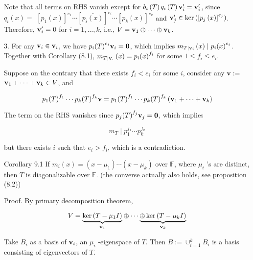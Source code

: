 \documentclass[11pt]{article}
\begin{document}
Note that all terms on RHS vanish except for \({b}_{i}\left( T\right) {q}_{i}\left( T\right) {\bf v}_{i}^{\prime } = {\bf v}_{i}^{\prime }\), since \({q}_{i}\left( x\right)  =\)  \({\left\lbrack  {p}_1\left( x\right) \right\rbrack  }^{{e}_1}\cdots {\left\lbrack  \overline{{p}_{i}\left( x\right) }\right\rbrack  }^{{e}_{i}}\cdots {\left\lbrack  {p}_{k}\left( x\right) \right\rbrack  }^{{e}_{k}}\) and \({\bf v}_{j}^{\prime } \in  \ker \left( {\left\lbrack  {p}_{j}\left( x\right) \right\rbrack  }^{{e}_{j}}\right)\). Therefore, \({\bf v}_{i}^{\prime } = 0\) for \(i = 1,\ldots ,k\), i.e., \(V = {\bf v}_1 \oplus  \cdots  \oplus  {\bf v}_{k}\).

3. For any \({\bf v}_{i} \in  {\bf v}_{i}\), we have \({p}_{i}{\left( T\right) }^{{e}_{i}}{\bf v}_{i} = \mathbf{0}\), which implies \({m}_{T \mid  {\bf v}_{i}}\left( x\right)  \mid  {p}_{i}{\left( x\right) }^{{e}_{i}}\). Together with Corollary (8.1), \({m}_{T \mid  {\bf v}_{i}}\left( x\right)  = {p}_{i}{\left( x\right) }^{{f}_{i}}\) for some \(1 \leq  {f}_{i} \leq  {e}_{i}\).

Suppose on the contrary that there exists \({f}_{i} < {e}_{i}\) for some \(i\), consider any \(\mathbf{v} \mathrel{\text{ := }}\)  \({\bf v}_1 + \cdots  + {\bf v}_{k} \in  V\), and

\[
{p}_1{\left( T\right) }^{{f}_1}\cdots {p}_{k}{\left( T\right) }^{{f}_{k}}\mathbf{v} = {p}_1{\left( T\right) }^{{f}_1}\cdots {p}_{k}{\left( T\right) }^{{f}_{k}}\left( {{\bf v}_1 + \cdots  + {\bf v}_{k}}\right)
\]

The term on the RHS vanishes since \({p}_{j}{\left( T\right) }^{{f}_{j}}{\bf v}_{j} = \mathbf{0}\), which implies

\[
{m}_{T} \mid  {p}_1^{{f}_1}\cdots {p}_{k}^{{f}_{k}}
\]

but there exists \(i\) such that \({e}_{i} > {f}_{i}\), which is a contradiction.

Corollary 9.1 If \({m}_{i}\left( x\right)  = \left( {x - {\mu }_1}\right) \cdots \left( {x - {\mu }_{k}}\right)\) over \(\mathbb{F}\), where \({\mu }_{i}\) ’s are distinct, then \(T\) is diagonalizable over \(\mathbb{F}\). (the converse actually also holds, see proposition (8.2))

Proof. By primary decomposition theorem,

\[
V = \underset{{\bf v}_1}{\underbrace{\ker \left( {T - {\mu }_1I}\right) }} \oplus  \cdots \underset{{\bf v}_{k}}{\underbrace{\oplus \ker \left( {T - {\mu }_{k}I}\right) }}
\]

Take \({B}_{i}\) as a basis of \({\bf v}_{i}\), an \({\mu }_{i}\) -eigenspace of \(T\). Then \(B \mathrel{\text{ := }} { \cup  }_{i = 1}^{k}{B}_{i}\) is a basis consisting of eigenvectors of \(T\).
\end{document}
